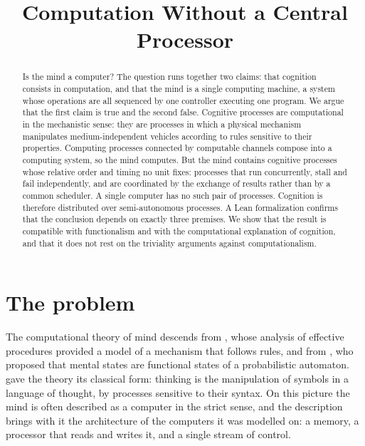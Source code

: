 \documentclass{situationist-preprint}
\title{Computation Without a Central Processor}
\begin{document}
\maketitle

\begin{abstract}
Is the mind a computer? The question runs together two claims: that cognition consists in computation, and that the mind is a single computing machine, a system whose operations are all sequenced by one controller executing one program. We argue that the first claim is true and the second false. Cognitive processes are computational in the mechanistic sense: they are processes in which a physical mechanism manipulates medium-independent vehicles according to rules sensitive to their properties. Computing processes connected by computable channels compose into a computing system, so the mind computes. But the mind contains cognitive processes whose relative order and timing no unit fixes: processes that run concurrently, stall and fail independently, and are coordinated by the exchange of results rather than by a common scheduler. A single computer has no such pair of processes. Cognition is therefore distributed over semi-autonomous processes. A Lean formalization confirms that the conclusion depends on exactly three premises. We show that the result is compatible with functionalism and with the computational explanation of cognition, and that it does not rest on the triviality arguments against computationalism.
\end{abstract}

\section{The problem}

The computational theory of mind descends from \citet{Turing1936}, whose analysis of effective procedures provided a model of a mechanism that follows rules, and from \citet{Putnam1967}, who proposed that mental states are functional states of a probabilistic automaton. \citet{Fodor1975} gave the theory its classical form: thinking is the manipulation of symbols in a language of thought, by processes sensitive to their syntax. On this picture the mind is often described as a computer in the strict sense, and the description brings with it the architecture of the computers it was modelled on: a memory, a processor that reads and writes it, and a single stream of control.
\end{document}
